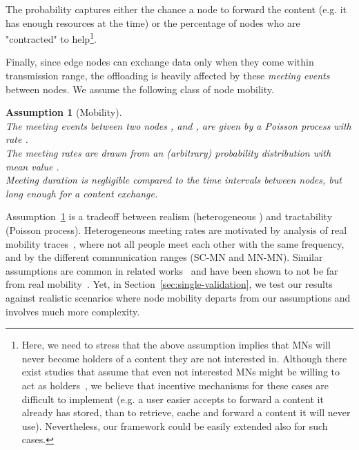 \documentclass[10pt,conference,letterpaper]{IEEEtran}
\newtheorem{assumption}{Assumption}
\begin{document}
The probability  captures either the chance a node to forward the content (e.g. it has enough resources at the time) or the percentage of nodes who are "contracted" to help\footnote{ Here, we need to stress that the above assumption implies that MNs will never become holders of a content they are not interested in. Although there exist studies that assume that even not interested MNs might be willing to act as holders~\cite{offloading-wowmom11,offloading-control-theory,fluid-limit-mass2012,offloading-double-opportunities}, we believe that incentive mechanisms for these cases are difficult to implement (e.g. a user easier accepts to forward a content it already has stored, than to retrieve, cache and forward a content it will never use). Nevertheless, our framework could be easily extended also for such cases.}.


Finally, since edge nodes can exchange data only when they come within transmission range, the offloading is heavily affected by these \textit{meeting events} between nodes. We assume the following class of node mobility.
\begin{assumption}[Mobility]\label{ass:heterogeneous-mobility}~\\
 The meeting events between two nodes ,  and , are given by a Poisson process with rate .\\
 The meeting rates  are drawn from an (arbitrary) probability distribution  with mean value .\\
 Meeting duration is negligible compared to the time intervals between nodes, but long enough for a content exchange.
\end{assumption}
Assumption~\ref{ass:heterogeneous-mobility} is a tradeoff between realism (heterogeneous ) and tractability (Poisson process). Heterogeneous meeting rates are motivated by analysis of real mobility traces~\cite{Gao2009,Conan2007}, where not all people meet each other with the same frequency, and by the different communication ranges (SC-MN and MN-MN). Similar assumptions are common in related works~\cite{Gao-user-centric-DTN,multiple-offloading,offloading-double-opportunities,fluid-limit-mass2012,offloading-control-theory} and have been shown to not be far from real mobility~\cite{Gao2009,Conan2007}. Yet, in Section~\ref{sec:single-validation}, we test our results against realistic scenarios where node mobility departs from our assumptions and involves much more complexity.
\end{document}
